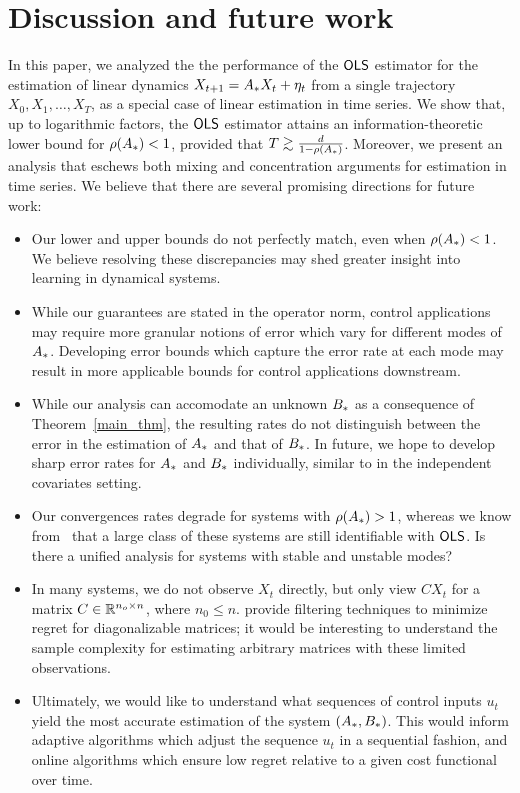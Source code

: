\section{Discussion and future work}
In this paper, we analyzed the the performance of the $\mathsf{OLS }$ estimator for the estimation of linear dynamics $X_{t + 1} = A_{*} X_t + \eta_t$ from a single trajectory $X_0, X_1, \ldots, X_T$, as a special case of linear estimation in time series. We show that, up to logarithmic factors, the $\mathsf{OLS }$ estimator attains an information-theoretic lower bound for $\rho(A_{*}) < 1$, provided that $T \gtrsim \frac{d}{1-\rho(A_{*})}$. Moreover, we present an analysis that eschews both mixing and concentration arguments for estimation in time series. We believe that there are several promising directions for future work:
\begin{itemize}
\item Our lower and upper bounds do not perfectly match, even when $\rho(A_{*}) < 1$. We believe resolving these discrepancies may shed greater insight into learning in dynamical systems.

\item While our guarantees are stated in the operator norm, control applications may require more granular notions of error which vary for different modes of $A_{*}$. Developing error bounds which capture the error rate at each mode may result in more applicable bounds for control applications downstream.

\item While our analysis can accomodate an unknown $B_{*}$ as a consequence of Theorem~\ref{main_thm}, 
the resulting rates do not distinguish between the error in the estimation of $A_{*}$ and that of $B_{*}$. In future, we hope to develop sharp error rates for $A_{*}$ and $B_{*}$ individually, similar to \cite{dean17} in the independent covariates setting.


\item Our convergences rates degrade for systems with $\rho(A_{*}) > 1$, whereas we know from~\cite{faradonbeh17a} that a large class of these systems are still identifiable with $\mathsf{OLS }$. Is there a unified analysis for systems with stable and unstable modes?

\item In many systems, we do not observe $X_t$ directly, but only view $CX_t$ for a matrix $C \in \mathbb{R}^{n_o \times n}$, where $n_0 \le n$. \cite{hazan17,hazan18} provide filtering techniques to minimize regret for diagonalizable matrices; it would be interesting to understand the sample complexity for estimating arbitrary matrices with these limited observations.
\item Ultimately, we would like to understand what sequences of control inputs $u_t$ yield the most accurate estimation of the system $(A_{*},B_{*})$. This would inform adaptive algorithms which adjust the sequence $u_t$ in a sequential fashion, and online algorithms which ensure low regret relative to a given cost functional over time.
\end{itemize}

